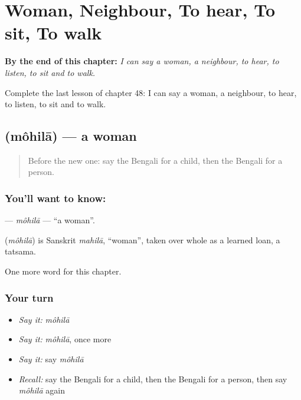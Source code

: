
\chapter{Woman, Neighbour, To hear, To sit, To walk}
\label{ch:bn-woman-neighbour-to-hear-to-sit-to-walk}

\begin{chapteropening}
\textbf{By the end of this chapter:} \emph{I can say a woman, a neighbour, to hear, to listen, to sit and to walk.}

Complete the last lesson of chapter 48: I can say a woman, a neighbour, to hear, to listen, to sit and to walk.
\end{chapteropening}

\section[\texorpdfstring{\bn{মহিলা} (môhilā)}{মহিলা (môhilā)}]{ (môhilā) — a woman}

\label{lesson:BN-C48-mohila}



\begin{quote}
Before the new one: say the Bengali for a child, then the Bengali for a person.
\end{quote}

\subsection*{You'll want to know: }
\textbf{} — \emph{môhilā} — \textquotedblleft{}a woman\textquotedblright{}.

\begin{cousinweb}
\textbf{} (\emph{môhilā}) is Sanskrit \emph{mahilā}, \textquotedblleft{}woman\textquotedblright{}, taken over whole as a learned loan, a tatsama.
\end{cousinweb}

\begin{grammarlens}[title={What you've built}]
One more word for this chapter.
\end{grammarlens}

\subsection*{Your turn}
\begin{itemize}
\raggedright
  \item \emph{Say it:} \emph{môhilā}
  \item \emph{Say it:} \emph{môhilā}, once more
  \item \emph{Say it:} say \emph{môhilā}
  \item \emph{Recall:} say the Bengali for a child, then the Bengali for a person, then say \emph{môhilā} again
\end{itemize}

